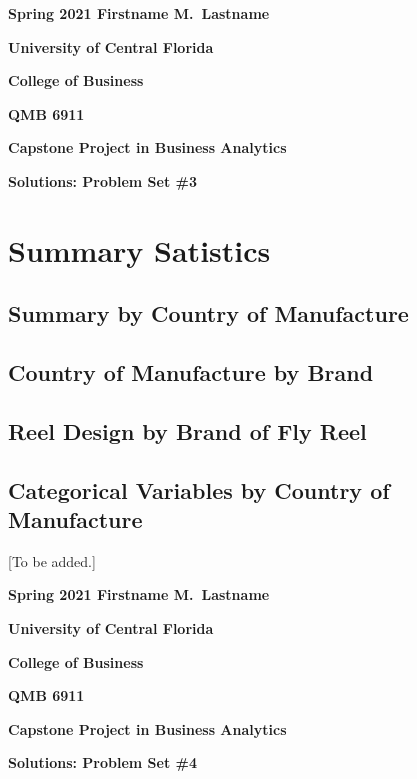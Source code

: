 \documentclass[11pt]{book}
\begin{document}

\pagestyle{empty}
{\noindent\bf Spring 2021 \hfill Firstname M.~Lastname}
\vskip 16pt
\centerline{\bf University of Central Florida}
\centerline{\bf College of Business}
\vskip 16pt
\centerline{\bf QMB 6911}
\centerline{\bf Capstone Project in Business Analytics}
\vskip 10pt
\centerline{\bf Solutions:  Problem Set \#3}
\vskip 32pt
\noindent


\section*{Summary Satistics}


\subsection*{Summary by Country of Manufacture}




\clearpage
\subsection*{Country of Manufacture by Brand}




\clearpage
\subsection*{Reel Design by Brand of Fly Reel}




\clearpage
\subsection*{Categorical Variables by Country of Manufacture}

[To be added.]



\pagebreak
\pagestyle{empty}
{\noindent\bf Spring 2021 \hfill Firstname M.~Lastname}
\vskip 16pt
\centerline{\bf University of Central Florida}
\centerline{\bf College of Business}
\vskip 16pt
\centerline{\bf QMB 6911}
\centerline{\bf Capstone Project in Business Analytics}
\vskip 10pt
\centerline{\bf Solutions:  Problem Set \#4}
\vskip 32pt
\noindent
\end{document}

